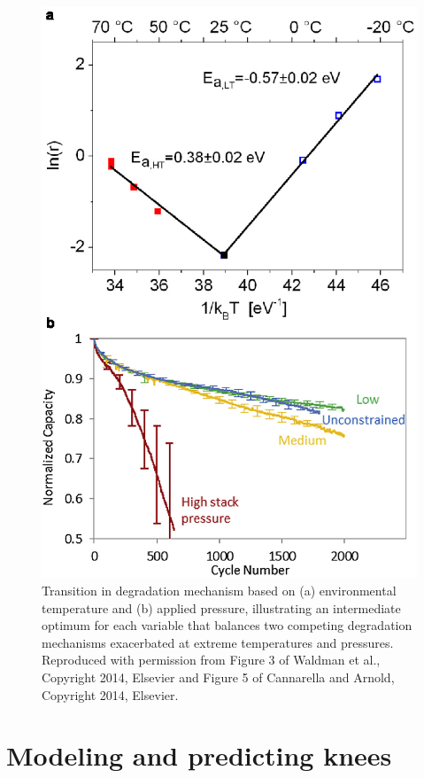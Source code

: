\documentclass[journal=jpclcd,manuscript=article]{achemso}
\begin{document}
\begin{figure}[ht!]
\centering
\includegraphics[scale = 1.0]{figures/temperature_pressure_sweet_spot.eps}
\caption{Transition in degradation mechanism based on (a) environmental temperature and (b) applied pressure, illustrating an intermediate optimum for each variable that balances two competing degradation mechanisms exacerbated at extreme temperatures and pressures. Reproduced with permission from Figure 3 of Waldman et al.\cite{waldmann_temperature_2014}, Copyright 2014, Elsevier and Figure 5 of Cannarella and Arnold\cite{cannarella_stress_2014}, Copyright 2014, Elsevier.}
\label{fig:temperature_and_pressure}
\end{figure}

\section{Modeling and predicting knees}
\end{document}

